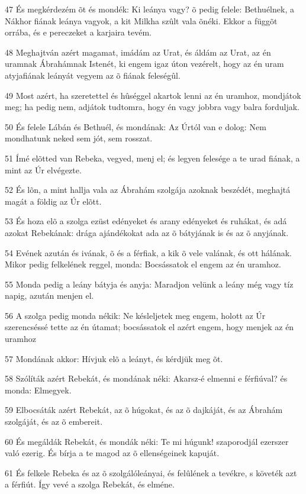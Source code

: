 \par 47 És megkérdezém õt és mondék: Ki leánya vagy? õ pedig felele: Bethuélnek, a Nákhor fiának leánya vagyok, a kit Milkha szûlt vala õnéki. Ekkor a függõt orrába, és e pereczeket a karjaira tevém.
\par 48 Meghajtván azért magamat, imádám az Urat, és áldám az Urat, az én uramnak Ábrahámnak Istenét, ki engem igaz úton vezérelt, hogy az én uram atyjafiának leányát vegyem az õ fiának feleségûl.
\par 49 Most azért, ha szeretettel és hûséggel akartok lenni az én uramhoz, mondjátok meg; ha pedig nem, adjátok tudtomra, hogy én vagy jobbra vagy balra forduljak.
\par 50 És felele Lábán és Bethuél, és mondának: Az Úrtól van e dolog: Nem mondhatunk neked sem jót, sem rosszat.
\par 51 Ímé elõtted van Rebeka, vegyed, menj el; és legyen felesége a te urad fiának, a mint az Úr elvégezte.
\par 52 És lõn, a mint hallja vala az Ábrahám szolgája azoknak beszédét, meghajtá magát a földig az Úr elõtt.
\par 53 És hoza elõ a szolga ezüst edényeket és arany edényeket és ruhákat, és adá azokat Rebekának: drága ajándékokat ada az õ bátyjának is és az õ anyjának.
\par 54 Evének azután és ivának, õ és a férfiak, a kik õ vele valának, és ott hálának. Mikor pedig felkelének reggel, monda: Bocsássatok el engem az én uramhoz.
\par 55 Monda pedig a leány bátyja és anyja: Maradjon velünk a leány még vagy tíz napig, azután menjen el.
\par 56 A szolga pedig monda nékik: Ne késleljetek meg engem, holott az Úr szerencséssé tette az én útamat; bocsássatok el azért engem, hogy menjek az én uramhoz
\par 57 Mondának akkor: Hívjuk elõ a leányt, és kérdjük meg õt.
\par 58 Szólíták azért Rebekát, és mondának néki: Akarsz-é elmenni e férfiúval? és monda: Elmegyek.
\par 59 Elbocsáták azért Rebekát, az õ húgokat, és az õ dajkáját, és az Ábrahám szolgáját, és az õ embereit.
\par 60 És megáldák Rebekát, és mondák néki: Te mi húgunk! szaporodjál ezerszer való ezerig. És bírja a te magod az õ ellenségeinek kapuját.
\par 61 És felkele Rebeka és az õ szolgálóleányai, és felûlének a tevékre, s követék azt a férfiút. Így vevé a szolga Rebekát, és elméne.
